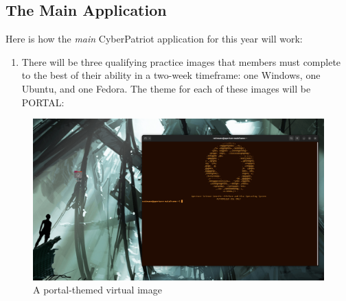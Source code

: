 \documentclass[
  letterpaper,
  DIV=11,
  numbers=noendperiod]{scrartcl}
\providecommand{\tightlist}{%
  \setlength{\itemsep}{0pt}\setlength{\parskip}{0pt}}\usepackage{longtable,booktabs,array}
\begin{document}
\hypertarget{the-main-application}{%
\subsection{The Main Application}\label{the-main-application}}

Here is how the \emph{main} CyberPatriot application for this year will
work:\\

\begin{enumerate}
\def\labelenumi{\arabic{enumi})}
\tightlist
\item
  There will be three qualifying practice images that members must
  complete to the best of their ability in a two-week timeframe: one
  Windows, one Ubuntu, and one Fedora. The theme for each of these
  images will be PORTAL:
\end{enumerate}

\begin{figure}

{\centering \includegraphics{PORTAL.png}

}

\caption{A portal-themed virtual image}

\end{figure}
\end{document}
